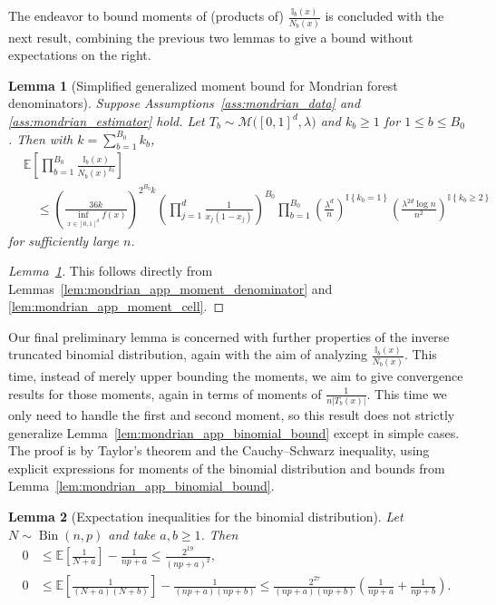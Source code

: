 \documentclass[11pt,lof]{puthesis}
\newcommand{\E}{\ensuremath{\mathbb{E}}}
\newcommand{\I}{\ensuremath{\mathbb{I}}}
\newcommand{\cM}{\ensuremath{\mathcal{M}}}
\DeclareMathOperator{\Bin}{Bin}
\theoremstyle{break}
\newtheorem{lemma}{Lemma}[section]
\theoremstyle{proof}
\newtheorem{proof}{Proof}
\begin{document}
The endeavor to bound moments of (products of) $\frac{\I_b(x)}{N_b(x)}$ is
concluded with the next result, combining the previous two lemmas to give a
bound without expectations on the right.

\begin{lemma}[Simplified generalized moment bound for
Mondrian forest denominators]%
\label{lem:mondrian_app_simple_moment_denominator}
%
Suppose Assumptions~\ref{ass:mondrian_data}
and \ref{ass:mondrian_estimator} hold.
Let $T_b \sim \cM\big([0,1]^d, \lambda\big)$
and $k_b \geq 1$ for $1 \leq b \leq B_0$.
Then with $k = \sum_{b=1}^{B_0} k_b$,
%
\begin{align*}
&\E\left[
\prod_{b=1}^{B_0}
\frac{\I_b(x)}{N_b(x)^{k_b}}
\right] \\
&\quad\leq
\left( \frac{36k}{\inf_{x \in [0,1]^d} f(x)} \right)^{2^{B_0} k}
\left(
\prod_{j=1}^{d} \frac{1}{x_j (1-x_j)}
\right)^{B_0}
\prod_{b=1}^{B_0}
\left(
\frac{\lambda^d}{n}
\right)^{\I \left\{ k_b = 1 \right\}}
\left(
\frac{\lambda^{2d} \log n}{n^2}
\right)^{\I \left\{ k_b \geq 2 \right\}}
\end{align*}
%
for sufficiently large $n$.
%
\end{lemma}

\begin{proof}[Lemma~\ref{lem:mondrian_app_simple_moment_denominator}]
This follows directly from
Lemmas~\ref{lem:mondrian_app_moment_denominator} and
\ref{lem:mondrian_app_moment_cell}.
\end{proof}

Our final preliminary lemma is concerned with further properties of
the inverse truncated binomial distribution, again with the aim
of analyzing $\frac{\I_b(x)}{N_b(x)}$.
This time, instead of merely upper bounding the moments,
we aim to give convergence results for those moments,
again in terms of moments of $\frac{1}{n |T_b(x)|}$.
This time we only need to handle the first
and second moment, so this result does not strictly generalize
Lemma~\ref{lem:mondrian_app_binomial_bound} except in simple cases.
The proof is by Taylor's theorem and the Cauchy--Schwarz inequality,
using explicit expressions for moments of the binomial distribution
and bounds from Lemma~\ref{lem:mondrian_app_binomial_bound}.

\begin{lemma}[Expectation inequalities for the binomial distribution]%
\label{lem:mondrian_app_binomial_expectation}
Let $N \sim \Bin(n, p)$ and take $a, b \geq 1$. Then
%
\begin{align*}
0
&\leq
\E \left[
\frac{1}{N+a}
\right]
- \frac{1}{n p+a}
\leq
\frac{2^{19}}{(n p+a)^2}, \\
0
&\leq
\E \left[
\frac{1}{(N+a)(N+b)}
\right]
- \frac{1}{(n p+a)(n p+b)}
\leq
\frac{2^{27}}{(n p +a)(n p +b)}
\left(
\frac{1}{n p + a}
+ \frac{1}{n p + b}
\right).
\end{align*}

\end{lemma}
\end{document}
